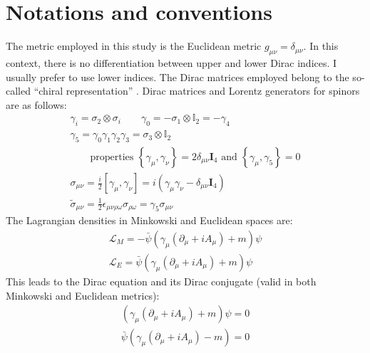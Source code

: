 \documentclass[english, LaM, oneside, noexaminfo]{sapthesis}
\begin{document}
\appendix %

\chapter{Notations and conventions}\label{app:notations}
\noindent
The metric employed in this study is the Euclidean metric $g_{\mu\nu} = \delta_{\mu\nu}$.
In this context, there is no differentiation between upper and lower Dirac indices.
I usually prefer to use lower indices.
\newline\newline
The Dirac matrices employed belong to the so-called ``chiral representation'' \cite{Itzykson-Zuber}.
Dirac matrices and Lorentz generators for spinors are as follows:
\begin{equation*}
    \begin{gathered}
        \gamma_i = \sigma_2 \otimes \sigma_i \qquad \gamma_0 = - \sigma_1 \otimes \mathbb{I}_2 = -\gamma_4 \\
        \gamma_5 = \gamma_0 \gamma_1 \gamma_2 \gamma_3 = \sigma_3 \otimes \mathbb{I}_2 \\
        \qquad \text{properties } \left\{ \gamma_\mu , \gamma_\nu \right\} = 2 \delta_{\mu\nu} \mathbf{I}_4 \text{ and } \left\{ \gamma_\mu , \gamma_5 \right\} = 0 \\
        \sigma_{\mu\nu} = \frac{i}{2} \left[\gamma_\mu , \gamma_\nu\right] = i \left(\gamma_\mu \gamma_\nu - \delta_{\mu\nu} \mathbf{I}_4\right) \\
        \tilde{\sigma}_{\mu\nu} = \frac{1}{2}\epsilon_{\mu\nu\rho\omega}\sigma_{\rho\omega} = \gamma_5 \sigma_{\mu\nu} 
    \end{gathered}
\end{equation*}
The Lagrangian densities in Minkowski and Euclidean spaces are:
\begin{equation*}
    \begin{gathered}
        \mathcal{L}_M = - \bar{\psi} \left( \gamma_\mu \left( \partial_\mu + i A_\mu \right) + m \right) \psi \\
        \mathcal{L}_E = \bar{\psi} \left( \gamma_\mu \left( \partial_\mu + i A_\mu \right) + m \right) \psi
    \end{gathered}
\end{equation*}
This leads to the Dirac equation and its Dirac conjugate (valid in both Minkowski and Euclidean metrics):
\begin{equation*}
    \begin{gathered}
        \left( \gamma_\mu \left( \partial_\mu + i A_\mu \right) + m \right) \psi = 0 \\
        \bar{\psi} \left( \gamma_\mu \left( \partial_\mu + i A_\mu \right) - m \right) = 0
    \end{gathered}
\end{equation*}
\end{document}
